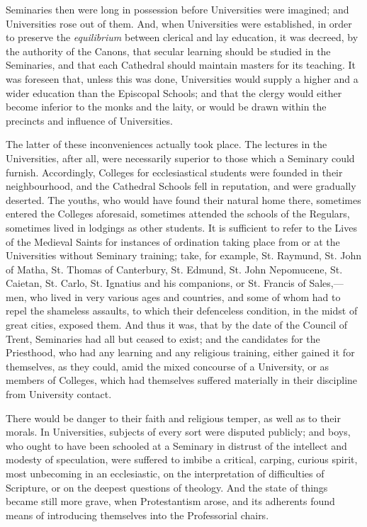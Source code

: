 Seminaries then were long in
possession before Universities were imagined; and Universities rose
out of them. And, when Universities were established, in order to
preserve the \emph{equilibrium} between clerical and lay education, it
was decreed, by the authority of the Canons, that secular learning
should be studied in the Seminaries, and that each Cathedral should
maintain masters for its teaching. It was foreseen that, unless this
was done, Universities would supply a higher and a wider education
than the Episcopal Schools; and that the clergy would either become
inferior to the monks and the laity, or would be drawn within the
precincts and influence of Universities.

The latter of these
inconveniences actually took place. The lectures in the Universities,
after all, were necessarily superior to those which a Seminary could
furnish. Accordingly, Colleges for ecclesiastical students were
founded in their neighbourhood, and the Cathedral Schools fell in
reputation, and were gradually deserted. The youths, who would have
found their natural home there, sometimes entered the Colleges
aforesaid, sometimes attended the schools of the Regulars, sometimes
lived in lodgings as other students. It is sufficient to refer to the
Lives of the Medieval Saints for instances of ordination taking place
from or at the Universities without Seminary training; take, for
example, St. Raymund, St. John of Matha, St. Thomas of Canterbury, St.
Edmund, St. John Nepomucene, St. Caietan, St. Carlo, St. Ignatius and
his companions, or St. Francis of Sales,—men, who lived in very
various ages and countries, and some of whom had to repel the
shameless assaults, to which their defenceless condition, in the midst
of great cities, exposed them. And thus it was, that by the date of
the Council of Trent, Seminaries had all but ceased to exist; and the
candidates for the Priesthood, who had any learning and any religious
training, either gained it for themselves, as they could, amid the
mixed concourse of a University, or as members of Colleges, which had
themselves suffered materially in their discipline from University
contact.

There would be danger to their
faith and religious temper, as well as to their morals. In
Universities, subjects of every sort were disputed publicly; and boys,
who ought to have been schooled at a Seminary in distrust of the
intellect and modesty of speculation, were suffered to imbibe a
critical, carping, curious spirit, most unbecoming in an ecclesiastic,
on the interpretation of difficulties of Scripture, or on the deepest
questions of theology. And the state of things became still more
grave, when Protestantism arose, and its adherents found means
of introducing themselves into the Professorial chairs.

